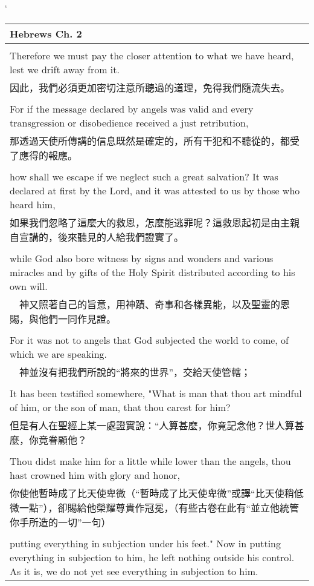 \newpage
`
\begin{tabularx}{\textwidth}{p{}}
\hline
Hebrews Ch. 2 \\
\hline \\
Therefore we must pay the closer attention to what we have heard, lest we drift away from it. \\
因此，我們必須更加密切注意所聽過的道理，免得我們隨流失去。 \\ \\
For if the message declared by angels was valid and every transgression or disobedience received a just retribution, \\
那透過天使所傳講的信息既然是確定的，所有干犯和不聽從的，都受了應得的報應。 \\ \\
how shall we escape if we neglect such a great salvation? It was declared at first by the Lord, and it was attested to us by those who heard him, \\
如果我們忽略了這麼大的救恩，怎麼能逃罪呢？這救恩起初是由主親自宣講的，後來聽見的人給我們證實了。 \\ \\
while God also bore witness by signs and wonders and various miracles and by gifts of the Holy Spirit distributed according to his own will. \\
　神又照著自己的旨意，用神蹟、奇事和各樣異能，以及聖靈的恩賜，與他們一同作見證。 \\ \\
For it was not to angels that God subjected the world to come, of which we are speaking. \\
　神並沒有把我們所說的“將來的世界”，交給天使管轄； \\ \\
It has been testified somewhere, "What is man that thou art mindful of him, or the son of man, that thou carest for him? \\
但是有人在聖經上某一處證實說：“人算甚麼，你竟記念他？世人算甚麼，你竟眷顧他？ \\ \\
Thou didst make him for a little while lower than the angels, thou hast crowned him with glory and honor, \\
你使他暫時成了比天使卑微（“暫時成了比天使卑微”或譯“比天使稍低微一點”），卻賜給他榮耀尊貴作冠冕，（有些古卷在此有“並立他統管你手所造的一切”一句） \\ \\
putting everything in subjection under his feet." Now in putting everything in subjection to him, he left nothing outside his control. As it is, we do not yet see everything in subjection to him. \\

\end{tabularx}
